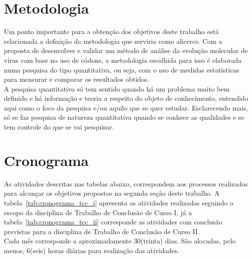 \documentclass[font=plain]{abnt}
\begin{document}
\chapter{Metodologia}
Um ponto importante para a obtenção dos objetivos deste trabalho está relacionada a definição da metodologia que serviria como alicerce. Com a proposta de desenvolver e validar um método de análise da evolução molecular de vírus com base no uso de códons, a metodologia escolhida para isso é elaborada numa pesquisa do tipo quantitativa, ou seja, com o uso de medidas estatísticas para mensurar e comparar os resultados obtidos.\\
A pesquisa quantitativa só tem sentido quando há um problema muito bem definido e há informação e teoria a respeito do objeto de conhecimento, entendido aqui como o foco da pesquisa e/ou aquilo que se quer estudar. Esclarecendo mais, só se faz pesquisa de natureza quantitativa quando se conhece as qualidades e se tem controle do que se vai pesquisar.\cite{da_silva_pesquisa_2014}




\chapter{Cronograma}
As atividades descritas nas tabelas abaixo, correspondem aos processos realizados para alcançar os objetivos propostos na segunda seção deste trabalho.
A tabela~\ref{tab:cronograma_tcc_i} apresenta as atividades realizadas seguindo o escopo da disciplina de Trabalho de Conclusão de Curso I, já a tabela~\ref{tab:cronograma_tcc_ii} corresponde as atividades com conclusão previstas para a disciplina de Trabalho de Conclusão de Curso II.\space\\
Cada mês corresponde a aproximadamente 30(trinta) dias. São alocadas, pelo menos, 6(seis) horas diárias para realização das atividades.
\end{document}
